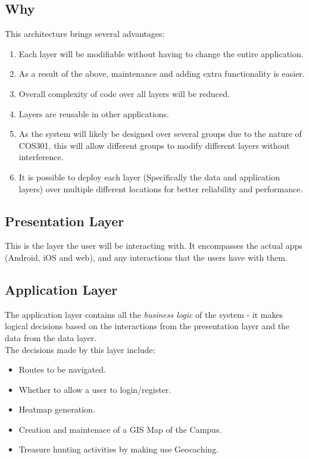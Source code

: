 \documentclass[english]{article}
\begin{document}
	    \subsection{Why}
	    This architecture brings several advantages:
	    \begin{enumerate}
	        \item Each layer will be modifiable without having to change the entire application.
	        \item As a result of the above, maintenance and adding extra functionality is easier.
	        \item Overall complexity of code over all layers will be reduced.
	        \item Layers are reusable in other applications.
	        \item As the system will likely be designed over several groups due to the nature of COS301, this will allow different groups to modify different layers without interference.
	        \item It is possible to deploy each layer (Specifically the data and application layers) over multiple different locations for better reliability and performance.
	    \end{enumerate}

	    \subsection{Presentation Layer}
	        This is the layer the user will be interacting with. It encompasses the actual apps (Android, iOS and web), and any interactions that the users have with them.

	    \subsection{Application Layer}
	        The application layer contains all the \textit{business logic} of the system - it makes logical decisions based on the interactions from the presentation layer and the data from the data layer.  \\
	        The decisions made by this layer include:
	        \begin{itemize}
	            \item Routes to be navigated.
	            \item Whether to allow a user to login/register.
	            \item Heatmap generation.
	            \item Creation and maintenace of a GIS Map of the Campus.
	            \item Treasure hunting activities by making use Geocaching.
	        \end{itemize}
\end{document}
